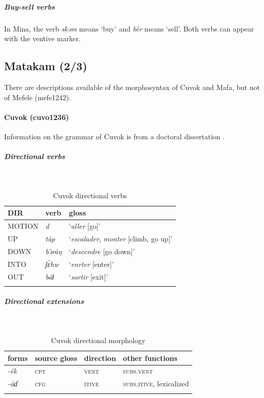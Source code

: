 \subparagraph{Buy-sell verbs}

In Mina, the verb \textit{skəm} means `buy' and \textit{bèr} means `sell'. Both verbs can appear with the ventive marker. 

\subsection{Matakam (2/3)}

There are descriptions available of the morphosyntax of Cuvok and Mafa, but not of Mefele (mefe1242).

\paragraph*{Cuvok (cuvo1236)} \label{cuvo}

Information on the grammar of Cuvok is from a doctoral dissertation \citep{dadakGrammaireCuvokLangue2021}.

\largerpage
\subparagraph{Directional verbs}~

\begin{table}[H]
\caption{Cuvok directional verbs} 
\label{tab:cuvoV}
\begin{tabular}{lll} %
	\lsptoprule
	DIR & verb & gloss   \\ %
	\midrule
	MOTION & \textit{d} & `\textit{aller} [go]' \\
	UP & \textit{tàp} & `\textit{escalader}, \textit{monter} [climb, go up]' \\
	DOWN & \textit{bə̀ràŋ} & `\textit{descendre} [go down]' \\
	INTO& \textit{ʃɛ̀hw} & `\textit{enrter} [enter]' \\
	OUT & \textit{báɬ} & `\textit{sortir} [exit]' \\
	\lspbottomrule
\end{tabular}
\end{table}

\subparagraph{Directional extensions}~

\begin{table}[H]
\caption{Cuvok directional morphology}
\label{tab:cuvo}
\begin{tabular}{llll} %
	\lsptoprule
	forms & source gloss & direction  & other functions  \\ %
	\midrule
	\textit{-ék}  &  \textsc{cpt}  &   \textsc{vent} &   \textsc{subs.vent}  \\
	\textit{-áɗ}  &  \textsc{cfg}  & \textsc{itive}  &   \textsc{subs.itive}, lexicalized \\
	\lspbottomrule
\end{tabular}
\end{table} 

